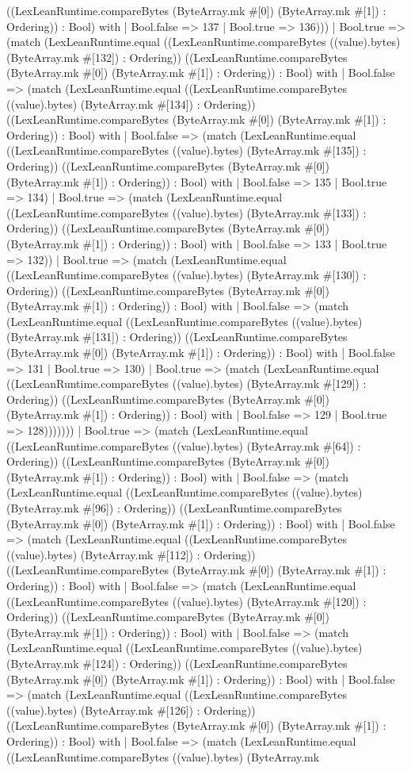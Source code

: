 \documentclass[11pt]{article}
\begin{document}
((LexLeanRuntime.compareBytes (ByteArray.mk \#[0]) (ByteArray.mk \#[1]) : Ordering)) : Bool) with | Bool.false => 137 | Bool.true => 136))) | Bool.true => (match (LexLeanRuntime.equal ((LexLeanRuntime.compareBytes ((value).bytes) (ByteArray.mk \#[132]) : Ordering)) ((LexLeanRuntime.compareBytes (ByteArray.mk \#[0]) (ByteArray.mk \#[1]) : Ordering)) : Bool) with | Bool.false => (match (LexLeanRuntime.equal ((LexLeanRuntime.compareBytes ((value).bytes) (ByteArray.mk \#[134]) : Ordering)) ((LexLeanRuntime.compareBytes (ByteArray.mk \#[0]) (ByteArray.mk \#[1]) : Ordering)) : Bool) with | Bool.false => (match (LexLeanRuntime.equal ((LexLeanRuntime.compareBytes ((value).bytes) (ByteArray.mk \#[135]) : Ordering)) ((LexLeanRuntime.compareBytes (ByteArray.mk \#[0]) (ByteArray.mk \#[1]) : Ordering)) : Bool) with | Bool.false => 135 | Bool.true => 134) | Bool.true => (match (LexLeanRuntime.equal ((LexLeanRuntime.compareBytes ((value).bytes) (ByteArray.mk \#[133]) : Ordering)) ((LexLeanRuntime.compareBytes (ByteArray.mk \#[0]) (ByteArray.mk \#[1]) : Ordering)) : Bool) with | Bool.false => 133 | Bool.true => 132)) | Bool.true => (match (LexLeanRuntime.equal ((LexLeanRuntime.compareBytes ((value).bytes) (ByteArray.mk \#[130]) : Ordering)) ((LexLeanRuntime.compareBytes (ByteArray.mk \#[0]) (ByteArray.mk \#[1]) : Ordering)) : Bool) with | Bool.false => (match (LexLeanRuntime.equal ((LexLeanRuntime.compareBytes ((value).bytes) (ByteArray.mk \#[131]) : Ordering)) ((LexLeanRuntime.compareBytes (ByteArray.mk \#[0]) (ByteArray.mk \#[1]) : Ordering)) : Bool) with | Bool.false => 131 | Bool.true => 130) | Bool.true => (match (LexLeanRuntime.equal ((LexLeanRuntime.compareBytes ((value).bytes) (ByteArray.mk \#[129]) : Ordering)) ((LexLeanRuntime.compareBytes (ByteArray.mk \#[0]) (ByteArray.mk \#[1]) : Ordering)) : Bool) with | Bool.false => 129 | Bool.true => 128))))))) | Bool.true => (match (LexLeanRuntime.equal ((LexLeanRuntime.compareBytes ((value).bytes) (ByteArray.mk \#[64]) : Ordering)) ((LexLeanRuntime.compareBytes (ByteArray.mk \#[0]) (ByteArray.mk \#[1]) : Ordering)) : Bool) with | Bool.false => (match (LexLeanRuntime.equal ((LexLeanRuntime.compareBytes ((value).bytes) (ByteArray.mk \#[96]) : Ordering)) ((LexLeanRuntime.compareBytes (ByteArray.mk \#[0]) (ByteArray.mk \#[1]) : Ordering)) : Bool) with | Bool.false => (match (LexLeanRuntime.equal ((LexLeanRuntime.compareBytes ((value).bytes) (ByteArray.mk \#[112]) : Ordering)) ((LexLeanRuntime.compareBytes (ByteArray.mk \#[0]) (ByteArray.mk \#[1]) : Ordering)) : Bool) with | Bool.false => (match (LexLeanRuntime.equal ((LexLeanRuntime.compareBytes ((value).bytes) (ByteArray.mk \#[120]) : Ordering)) ((LexLeanRuntime.compareBytes (ByteArray.mk \#[0]) (ByteArray.mk \#[1]) : Ordering)) : Bool) with | Bool.false => (match (LexLeanRuntime.equal ((LexLeanRuntime.compareBytes ((value).bytes) (ByteArray.mk \#[124]) : Ordering)) ((LexLeanRuntime.compareBytes (ByteArray.mk \#[0]) (ByteArray.mk \#[1]) : Ordering)) : Bool) with | Bool.false => (match (LexLeanRuntime.equal ((LexLeanRuntime.compareBytes ((value).bytes) (ByteArray.mk \#[126]) : Ordering)) ((LexLeanRuntime.compareBytes (ByteArray.mk \#[0]) (ByteArray.mk \#[1]) : Ordering)) : Bool) with | Bool.false => (match (LexLeanRuntime.equal ((LexLeanRuntime.compareBytes ((value).bytes) (ByteArray.mk 
\end{document}
